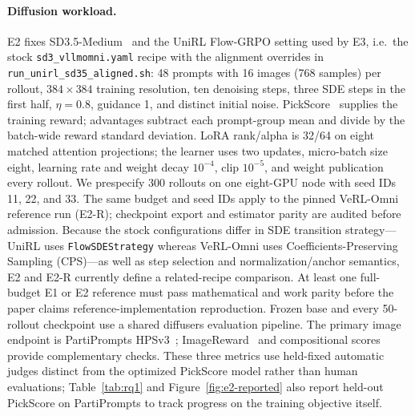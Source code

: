 \documentclass[10pt]{article}
\newcommand{\codepath}[1]{\texttt{#1}}
\begin{document}
\paragraph{Diffusion workload.}
E2 fixes SD3.5-Medium~\citep{sd35medium2024} and the UniRL Flow-GRPO setting used by E3, i.e.\ the stock \codepath{sd3\_vllmomni.yaml} recipe with the alignment overrides in \codepath{run\_unirl\_sd35\_aligned.sh}: 48 prompts with 16 images (768 samples) per rollout, $384\times384$ training resolution, ten denoising steps, three SDE steps in the first half, $\eta=0.8$, guidance 1, and distinct initial noise.
PickScore~\citep{kirstain2023pickapic} supplies the training reward; advantages subtract each prompt-group mean and divide by the batch-wide reward standard deviation.
LoRA rank/alpha is 32/64 on eight matched attention projections; the learner uses two updates, micro-batch size eight, learning rate and weight decay $10^{-4}$, clip $10^{-5}$, and weight publication every rollout.
We prespecify 300 rollouts on one eight-GPU node with seed IDs 11, 22, and 33.
The same budget and seed IDs apply to the pinned VeRL-Omni reference run (E2-R); checkpoint export and estimator parity are audited before admission.
Because the stock configurations differ in SDE transition strategy---UniRL uses \texttt{FlowSDEStrategy} whereas VeRL-Omni uses Coefficients-Preserving Sampling (CPS)---as well as step selection and normalization/anchor semantics, E2 and E2-R currently define a related-recipe comparison. At least one full-budget E1 or E2 reference must pass mathematical and work parity before the paper claims reference-implementation reproduction.
Frozen base and every 50-rollout checkpoint use a shared diffusers evaluation pipeline. The primary image endpoint is PartiPrompts HPSv3~\citep{ma2025hpsv3}; ImageReward~\citep{xu2023imagereward} and compositional scores provide complementary checks.
These three metrics use held-fixed automatic judges distinct from the optimized PickScore model rather than human evaluations; Table~\ref{tab:rq1} and Figure~\ref{fig:e2-reported} also report held-out PickScore on PartiPrompts to track progress on the training objective itself.
\end{document}
